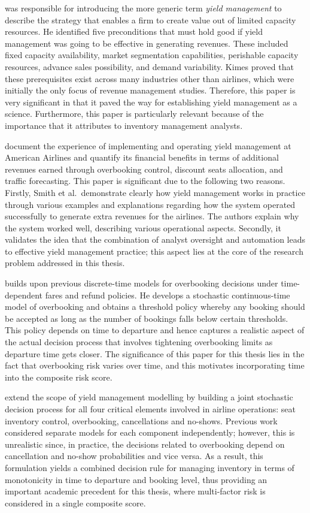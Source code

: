 \citet{Kimes1989} was responsible for introducing the more generic term \emph{yield management} to describe the strategy that enables a firm to create value out of limited capacity resources. He identified five preconditions that must hold good if yield management was going to be effective in generating revenues. These included fixed capacity availability, market segmentation capabilities, perishable capacity resources, advance sales possibility, and demand variability. Kimes proved that these prerequisites exist across many industries other than airlines, which were initially the only focus of revenue management studies. Therefore, this paper is very significant in that it paved the way for establishing yield management as a science. Furthermore, this paper is particularly relevant because of the importance that it attributes to inventory management analysts.

\citet{SmithLeimkuhlerDarrow1992} document the experience of implementing and operating yield management at American Airlines and quantify its financial benefits in terms of additional revenues earned through overbooking control, discount seats allocation, and traffic forecasting. This paper is significant due to the following two reasons. Firstly, Smith et al.\ demonstrate clearly how yield management works in practice through various examples and explanations regarding how the system operated successfully to generate extra revenues for the airlines. The authors explain why the system worked well, describing various operational aspects. Secondly, it validates the idea that the combination of analyst oversight and automation leads to effective yield management practice; this aspect lies at the core of the research problem addressed in this thesis.

\citet{Chatwin1999} builds upon previous discrete-time models for overbooking decisions under time-dependent fares and refund policies. He develops a stochastic continuous-time model of overbooking and obtains a threshold policy whereby any booking should be accepted as long as the number of bookings falls below certain thresholds. This policy depends on time to departure and hence captures a realistic aspect of the actual decision process that involves tightening overbooking limits as departure time gets closer. The significance of this paper for this thesis lies in the fact that overbooking risk varies over time, and this motivates incorporating time into the composite risk score.

\citet{SubramanianStidhamLautenbacher1999} extend the scope of yield management modelling by building a joint stochastic decision process for all four critical elements involved in airline operations: seat inventory control, overbooking, cancellations and no-shows. Previous work considered separate models for each component independently; however, this is unrealistic since, in practice, the decisions related to overbooking depend on cancellation and no-show probabilities and vice versa. As a result, this formulation yields a combined decision rule for managing inventory in terms of monotonicity in time to departure and booking level, thus providing an important academic precedent for this thesis, where multi-factor risk is considered in a single composite score.

